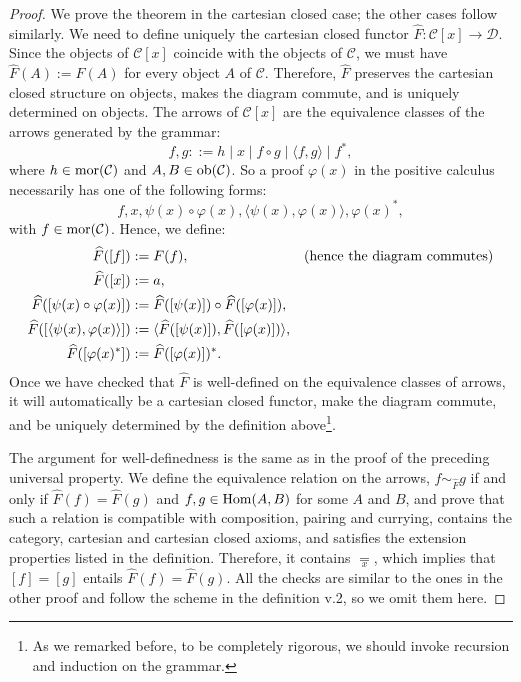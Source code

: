 \begin{proof}
    We prove the theorem in the cartesian closed case; the other cases follow similarly. We need to define uniquely the cartesian closed functor $\widehat F : \mathcal C[x] \to \mathcal D$.
    Since the objects of $\mathcal C[x]$ coincide with the objects of $\mathcal C$, we must have $\widehat F(A) := F(A)$ for every object $A$ of $\mathcal C$. Therefore, $\widehat F$ preserves the cartesian closed structure on objects, makes the diagram commute, and is uniquely determined on objects.
    The arrows of $\mathcal C[x]$ are the equivalence classes of the arrows generated by the grammar:
    \[ f,g ::= h \mid x \mid f \circ g \mid \langle f, g \rangle \mid f^*,\]
    where $h \in \operatorname{mor}(\mathcal C)$ and $A,B \in \operatorname{ob}(\mathcal C)$. So a proof $\varphi(x)$ in the positive calculus necessarily has one of the following forms:
    \[ f,x,\psi(x) \circ \varphi(x), \langle \psi(x), \varphi(x)\rangle, \varphi(x)^*, \]
    with $f \in \operatorname{mor}(\mathcal C)$. Hence, we define:
    \begin{align*}
        \widehat F([f]) &:= F(f), &&(\textnormal{hence the diagram commutes})\\
        \widehat F([x]) &:= a, \\
        \widehat F([\psi(x) \circ \varphi(x)]) &:= \widehat F([\psi(x)]) \circ \widehat F([\varphi(x)]), \\
        \widehat F([\langle \psi(x), \varphi(x)\rangle]) &:= \langle \widehat F([\psi(x)]), \widehat F([\varphi(x)])\rangle, \\
        \widehat F([\varphi(x)^*]) &:= \widehat F([\varphi(x)])^*.
    \end{align*}
    Once we have checked that $\widehat F$ is well-defined on the equivalence classes of arrows, it will automatically be a cartesian closed functor, make the diagram commute, and be uniquely determined by the definition above\footnote{As we remarked before, to be completely rigorous, we should invoke recursion and induction on the grammar.}.\par
    The argument for well-definedness is the same as in the proof of the preceding universal property. We define the equivalence relation on the arrows, $f \sim_{\widehat F} g$ if and only if $\widehat F(f) = \widehat F(g)$ and $f,g \in \operatorname{Hom}(A,B)$ for some $A$ and $B$, and prove that such a relation is compatible with composition, pairing and currying, contains the category, cartesian and cartesian closed axioms, and satisfies the extension properties listed in the definition. Therefore, it contains $\underset{x}{=}$, which implies that $[f] = [g]$ entails $\widehat F(f) = \widehat F(g)$. All the checks are similar to the ones in the other proof and follow the scheme in the definition v.2, so we omit them here.
\end{proof}

